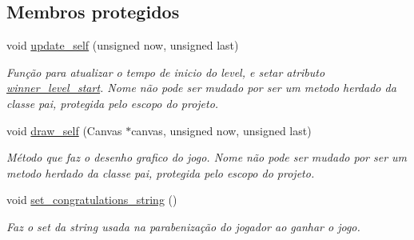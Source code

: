 \subsection*{Membros protegidos}
\begin{DoxyCompactItemize}
\item 
void \mbox{\hyperlink{classWinnerLevel_a5410c32163d0541883db5f7f54623e80}{update\+\_\+self}} (unsigned now, unsigned last)
\begin{DoxyCompactList}\small\item\em Função para atualizar o tempo de inicio do level, e setar atributo \mbox{\hyperlink{classWinnerLevel_a7aaaf28d27b0f09fca07ccbdc9ee2a57}{winner\+\_\+level\+\_\+start}}. Nome não pode ser mudado por ser um metodo herdado da classe pai, protegida pelo escopo do projeto. \end{DoxyCompactList}\item 
void \mbox{\hyperlink{classWinnerLevel_a0b58acd2f2c85ce28df09260684f3180}{draw\+\_\+self}} (Canvas $\ast$canvas, unsigned now, unsigned last)
\begin{DoxyCompactList}\small\item\em Método que faz o desenho grafico do jogo. Nome não pode ser mudado por ser um metodo herdado da classe pai, protegida pelo escopo do projeto. \end{DoxyCompactList}\item 
void \mbox{\hyperlink{classWinnerLevel_a22e2395a8b72405050c2a321aa1fb644}{set\+\_\+congratulations\+\_\+string}} ()
\begin{DoxyCompactList}\small\item\em Faz o \textquotesingle{}set\textquotesingle{} da string usada na parabenização do jogador ao ganhar o jogo. \end{DoxyCompactList}\end{DoxyCompactItemize}
